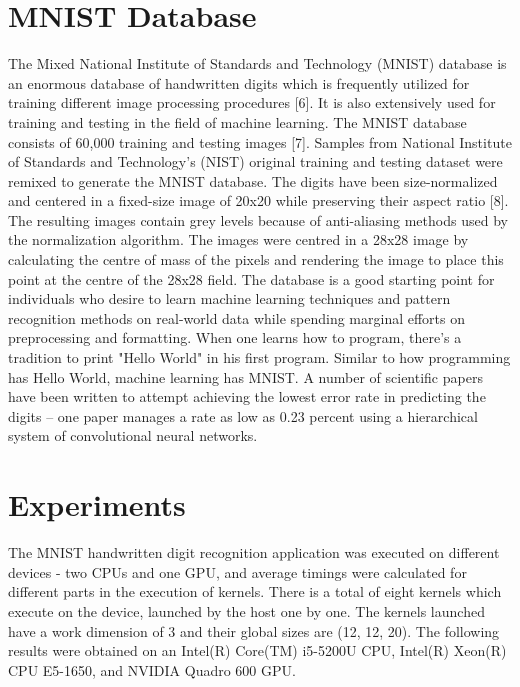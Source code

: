 \section{MNIST Database}
\label{sect5_2}
The Mixed National Institute of Standards and Technology (MNIST) database is an enormous database of handwritten digits which is frequently utilized for training different image processing procedures [6]. It is also extensively used for training and testing in the field of machine learning. \newline\newline 
The MNIST database consists of 60,000 training and testing images [7]. Samples from National Institute of Standards and Technology’s (NIST) original training and testing dataset were remixed to generate the MNIST database. The digits have been size-normalized and centered in a fixed-size image of 20x20 while preserving their aspect ratio [8]. The resulting images contain grey levels because of anti-aliasing methods used by the normalization algorithm. The images were centred in a 28x28 image by calculating the centre of mass of the pixels and rendering the image to place this point at the centre of the 28x28 field. \newline\newline
The database is a good starting point for individuals who desire to learn machine learning techniques and pattern recognition methods on real-world data while spending marginal efforts on preprocessing and formatting. When one learns how to program, there's a tradition to print "Hello World" in his first program. Similar to how programming has Hello World, machine learning has MNIST. \newline\newline
A number of scientific papers have been written to attempt achieving the lowest error rate in predicting the digits – one paper manages a rate as low as 0.23 percent using a hierarchical system of convolutional neural networks.

\section{Experiments}
\label{sect5_3}
The MNIST handwritten digit recognition application was executed on different devices - two CPUs and one GPU, and average timings were calculated for different parts in the execution of kernels. There is a total of eight kernels which execute on the device, launched by the host one by one. The kernels launched have a work dimension of 3 and their global sizes are (12, 12, 20). \newline\newline
The following results were obtained on an Intel(R) Core(TM) i5-5200U CPU, Intel(R) Xeon(R) CPU E5-1650, and NVIDIA Quadro 600 GPU. \newline

